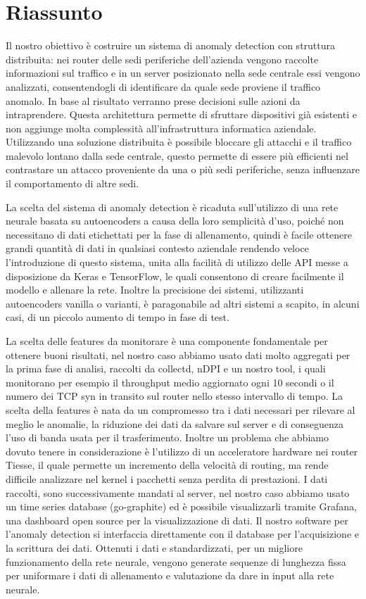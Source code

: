 \section{Riassunto}

Il nostro obiettivo è costruire un sistema di anomaly detection con struttura distribuita: nei router delle sedi periferiche dell'azienda vengono raccolte informazioni sul traffico e in un server posizionato nella sede centrale essi vengono analizzati, consentendogli di identificare da quale sede proviene il traffico anomalo. In base al risultato verranno prese decisioni sulle azioni da intraprendere. Questa architettura permette di sfruttare dispositivi già esistenti e non aggiunge molta complessità all'infrastruttura informatica aziendale. Utilizzando una soluzione distribuita è possibile bloccare gli attacchi e il traffico malevolo lontano dalla sede centrale, questo permette di essere più efficienti nel contrastare un attacco proveniente da una o più sedi periferiche, senza influenzare il comportamento di altre sedi.

La scelta del sistema di anomaly detection è ricaduta sull'utilizzo di una rete neurale basata su autoencoders a causa della loro semplicità d'uso, poiché non necessitano di dati etichettati per la fase di allenamento, quindi è facile ottenere grandi quantità di dati in qualsiasi contesto aziendale rendendo veloce l'introduzione di questo sistema, unita alla facilità di utilizzo delle API messe a disposizione da Keras e TensorFlow, le quali consentono di creare facilmente il modello e allenare la rete. Inoltre la precisione dei sistemi, utilizzanti autoencoders vanilla o varianti, è paragonabile ad altri sistemi a scapito, in alcuni casi, di un piccolo aumento di tempo in fase di test.

La scelta delle features da monitorare è una componente fondamentale per ottenere buoni risultati, nel nostro caso abbiamo usato dati molto aggregati per la prima fase di analisi, raccolti da collectd, nDPI e un nostro tool, i quali monitorano per esempio il throughput medio aggiornato ogni 10 secondi o il numero dei TCP syn in transito sul router nello stesso intervallo di tempo. La scelta della features è nata da un compromesso tra i dati necessari per rilevare al meglio le anomalie, la riduzione dei dati da salvare sul server e di conseguenza l'uso di banda usata per il trasferimento. Inoltre un problema che abbiamo dovuto tenere in considerazione è l'utilizzo di un acceleratore hardware nei router Tiesse, il quale permette un incremento della velocità di routing, ma rende difficile analizzare nel kernel i pacchetti senza perdita di prestazioni. I dati raccolti, sono successivamente mandati al server, nel nostro caso abbiamo usato un time series database (go-graphite) ed è possibile visualizzarli tramite Grafana, una dashboard open source per la visualizzazione di dati. Il nostro software per l’anomaly detection si interfaccia direttamente con il database per l’acquisizione e la scrittura dei dati. Ottenuti i dati e standardizzati, per un migliore funzionamento della rete neurale, vengono generate sequenze di lunghezza fissa per uniformare i dati di allenamento e valutazione da dare in input alla rete neurale.

